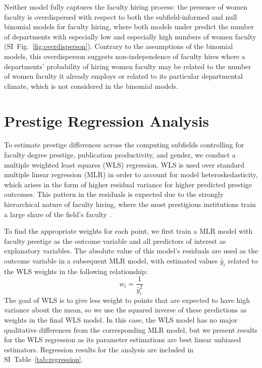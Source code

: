 \documentclass[reprint, twocolumn, aps, nofootinbib, superscriptaddress, longbibliography]{revtex4-1}
\begin{document}
Neither model fully captures the faculty hiring process: the presence of women faculty is overdispersed with respect to both the subfield-informed and null binomial models for faculty hiring, where both models under predict the number of departments with especially low and especially high numbers of women faculty (SI~Fig.~\ref{fig:overdisperson}). Contrary to the assumptions of the binomial models, this overdisperson suggests non-independence of faculty hires where a departments' probability of hiring women faculty may be related to the number of women faculty it already employs or related to its particular departmental climate, which is not considered in the binomial models. 

\section{Prestige Regression Analysis}\label{sec:si_regression} 

To estimate prestige differences across the computing subfields controlling for faculty degree prestige, publication productivity, and gender, we conduct a multiple weighted least squares (WLS) regression. WLS is used over standard multiple linear regression (MLR) in order to account for model heteroskedasticity, which arises in the form of higher residual variance for higher predicted prestige outcomes. This pattern in the residuals is expected due to the strongly hierarchical nature of faculty hiring, where the most prestigious institutions train a large share of the field’s faculty \cite{clauset2015systematic, way2016gender}. 

To find the appropriate weights for each point, we first train a MLR model with faculty prestige as the outcome variable and all predictors of interest as explanatory variables. The absolute value of this model’s residuals are used as the outcome variable in a subsequent MLR model, with estimated values $\hat{y}_i$ related to the WLS weights in the following relationship: $$w_i=\frac{1}{\hat{y}_i^2}$$The goal of WLS is to give less weight to points that are expected to have high variance about the mean, so we use the squared inverse of these predictions as weights in the final WLS model. In this case, the WLS model has no major qualitative differences from the corresponding MLR model, but we present results for the WLS regression as its parameter estimations are best linear unbiased estimators. Regression results for the analysis are included in SI~Table~\ref{tab:regression}. 
\end{document}

